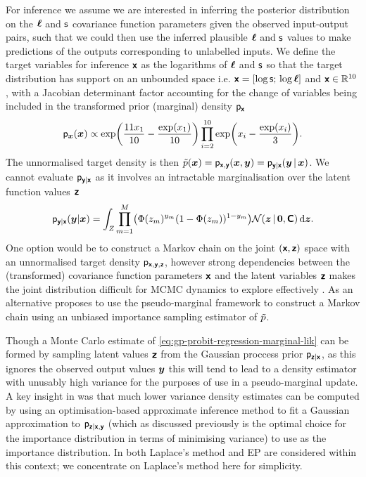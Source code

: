 For inference we assume we are interested in inferring the posterior distribution on the $\boldsymbol{\mathsf{\ell}}$ and $\mathsf{s}$ covariance function parameters given the observed input-output pairs, such that we could then use the inferred plausible $\boldsymbol{\mathsf{\ell}}$ and $\mathsf{s}$ values to make predictions of the outputs corresponding to unlabelled inputs. We define the target variables for inference $\boldsymbol{\mathsf{x}}$ as the logarithms of $\boldsymbol{\mathsf{\ell}}$ and $\mathsf{s}$ so that the target distribution has support on an unbounded space i.e. $\boldsymbol{\mathsf{x}} = [\log\mathsf{s};\,\log\boldsymbol{\mathsf{\ell}}]$ and $\boldsymbol{\mathsf{x}} \in \mathbb{R}^{10}$, with a Jacobian determinant factor accounting for the change of variables being included in the transformed prior (marginal) density $\mathsf{p}_{\boldsymbol{\mathsf{x}}}$
\begin{equation}\label{eq:gp-model-target-prior}
  \pden{\vct{x}}(\vct{x}) \propto 
  \exp\lpa\frac{11 x_1}{10} -\frac{\exp(x_1)}{10}\rpa \prod_{i=2}^{10} \exp\lpa x_i -\frac{\exp(x_i)}{3}\rpa.
\end{equation}
The unnormalised target density is then $\tilde{p}(\boldsymbol{x}) = \mathsf{p}_{\boldsymbol{\mathsf{x}},\boldsymbol{\mathsf{y}}}(\boldsymbol{x},\boldsymbol{y}) = \mathsf{p}_{\boldsymbol{\mathsf{y}}|\boldsymbol{\mathsf{x}}}(\boldsymbol{y}\operatorname{|}\boldsymbol{x})$. We cannot evaluate $\mathsf{p}_{\boldsymbol{\mathsf{y}}|\boldsymbol{\mathsf{x}}}$ as it involves an intractable marginalisation over the latent function values $\boldsymbol{\mathsf{z}}$
\begin{equation}\label{eq:gp-probit-regression-marginal-lik}
\begin{split}
  \pden{\rvct{y}|\rvct{x}}(\vct{y}|\vct{x}) =
  \int_{\set{Z}} 
    \prod_{m=1}^M\lpa \Phi(z_m)^{y_m} (1 - \Phi(z_m))^{1-y_m} \rpa
    \nrm{\vct{z} \gvn \vct{0}, \rvct{C}}
  \,\dr\vct{z}.
\end{split}
\end{equation}
One option would be to construct a Markov chain on the joint $(\boldsymbol{\mathsf{x}},\boldsymbol{\mathsf{z}})$ space with an unnormalised target density $\mathsf{p}_{\boldsymbol{\mathsf{x}},\boldsymbol{\mathsf{y}},\boldsymbol{\mathsf{z}}}$, however strong dependencies between the (transformed) covariance function parameters $\boldsymbol{\mathsf{x}}$ and the latent variables $\boldsymbol{\mathsf{z}}$ makes the joint distribution difficult for \ac{MCMC} dynamics to explore effectively \citep{filippone2014pseudo}. As an alternative \citep{filippone2014pseudo} proposes to use the pseudo-marginal framework to construct a Markov chain using an unbiased importance sampling estimator of $\tilde{p}$.

Though a Monte Carlo estimate of \eqref{eq:gp-probit-regression-marginal-lik} can be formed by sampling latent values $\boldsymbol{\mathsf{z}}$ from the Gaussian proccess prior $\mathsf{p}_{\boldsymbol{\mathsf{z}}|\boldsymbol{\mathsf{x}}}$, as this ignores the observed output values $\boldsymbol{y}$ this will tend to lead to a density estimator with unusably high variance for the purposes of use in a pseudo-marginal update. A key insight in \citep{filippone2014pseudo} was that much lower variance density estimates can be computed by using an optimisation-based approximate inference method to fit a Gaussian approximation to $\mathsf{p}_{\boldsymbol{\mathsf{z}}|\boldsymbol{\mathsf{x}},\boldsymbol{\mathsf{y}}}$ (which as discussed previously is the optimal choice for the importance distribution in terms of minimising variance) to use as the importance distribution. In \citep{filippone2014pseudo} both Laplace's method and \ac{EP} are considered within this context; we concentrate on Laplace's method here for simplicity.

